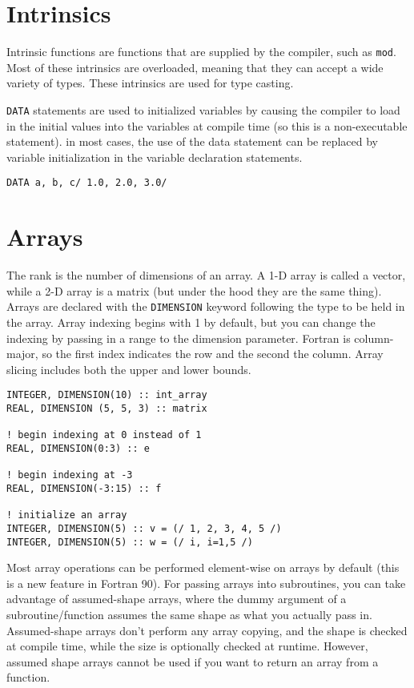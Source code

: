 \documentclass[10pt]{article}
\begin{document}
\section{Intrinsics}
Intrinsic functions are functions that are supplied by the compiler, such as {\tt mod}. Most of these intrinsics are overloaded, meaning that they can accept a wide variety of types. These intrinsics are used for type casting.

{\tt DATA} statements are used to initialized variables by causing the compiler to load in the initial values into the variables at compile time (so this is a non-executable statement). in most cases, the use of the data statement can be replaced by variable initialization in the variable declaration statements. 

\begin{lstlisting}
DATA a, b, c/ 1.0, 2.0, 3.0/
\end{lstlisting}

\section{Arrays}
The rank is the number of dimensions of an array. A 1-D array is called a vector, while a 2-D array is a matrix (but under the hood they are the same thing). Arrays are declared with the {\tt DIMENSION} keyword following the type to be held in the array. Array indexing begins with 1 by default, but you can change the indexing by passing in a range to the dimension parameter. Fortran is column-major, so the first index indicates the row and the second the column. Array slicing includes both the upper and lower bounds.

\begin{lstlisting}
INTEGER, DIMENSION(10) :: int_array
REAL, DIMENSION (5, 5, 3) :: matrix

! begin indexing at 0 instead of 1
REAL, DIMENSION(0:3) :: e

! begin indexing at -3
REAL, DIMENSION(-3:15) :: f

! initialize an array
INTEGER, DIMENSION(5) :: v = (/ 1, 2, 3, 4, 5 /)
INTEGER, DIMENSION(5) :: w = (/ i, i=1,5 /)
\end{lstlisting}

Most array operations can be performed element-wise on arrays by default (this is a new feature in Fortran 90). For passing arrays into subroutines, you can take advantage of assumed-shape arrays, where the dummy argument of a subroutine/function assumes the same shape as what you actually pass in. Assumed-shape arrays don't perform any array copying, and the shape is checked at compile time, while the size is optionally checked at runtime. However, assumed shape arrays cannot be used if you want to return an array from a function.
\end{document}

